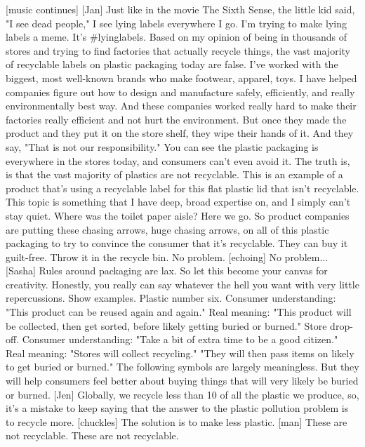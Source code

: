 \documentclass[a4paper]{article}
\begin{document}
	[music continues]
	[Jan] Just like in the movie The Sixth Sense,
	the little kid said, "I see dead people,"
	I see lying labels everywhere I go.
	I'm trying to make lying labels a meme.
	It's \#lyinglabels.
	Based on my opinion of being in thousands of stores
	and trying to find factories that actually recycle things,
	the vast majority of recyclable labels on plastic packaging today are false.
	I've worked with the biggest, most well-known brands
	who make footwear, apparel, toys.
	I have helped companies figure out how to design and manufacture safely,
	efficiently, and really environmentally best way.
	And these companies worked really hard
	to make their factories really efficient and not hurt the environment.
	But once they made the product and they put it on the store shelf,
	they wipe their hands of it.
	And they say, "That is not our responsibility."
	You can see the plastic packaging is everywhere in the stores today,
	and consumers can't even avoid it.
	The truth is, is that the vast majority of plastics are not recyclable.
	This is an example of a product that's using a recyclable label
	for this flat plastic lid that isn't recyclable.
	This topic is something that I have deep, broad expertise on,
	and I simply can't stay quiet.
	Where was the toilet paper aisle?
	Here we go.
	So product companies are putting these chasing arrows,
	huge chasing arrows,
	on all of this plastic packaging
	to try to convince the consumer that it's recyclable.
	They can buy it guilt-free.
	Throw it in the recycle bin.
	No problem.
	[echoing] No problem...
	[Sasha] Rules around packaging are lax.
	So let this become your canvas for creativity.
	Honestly, you really can say whatever the hell you want
	with very little repercussions.
	Show examples.
	Plastic number six.
	Consumer understanding:
	"This product can be reused again and again."
	Real meaning: "This product will be collected, then get sorted,
	before likely getting buried
	or burned."
	Store drop-off.
	Consumer understanding:
	"Take a bit of extra time to be a good citizen."
	Real meaning: "Stores will collect recycling."
	"They will then pass items on
	likely to get buried
	or burned."
	The following symbols are largely meaningless.
	But they will help consumers feel better about buying things
	that will very likely be buried or burned.
	[Jen] Globally, we recycle less than 10%
	of all the plastic we produce,
	so, it's a mistake to keep saying
	that the answer to the plastic pollution problem
	is to recycle more.
	[chuckles] The solution is to make less plastic.
	[man] These are not recyclable.
	These are not recyclable.
\end{document}
